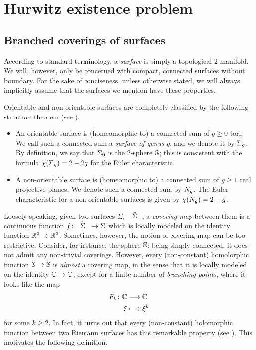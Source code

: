 \chapter{Hurwitz existence problem}

\section{Branched coverings of surfaces}

According to standard terminology, a \emph{surface} is simply a topological $2$-manifold. We will, however, only be concerned with compact, connected surfaces without boundary. For the sake of conciseness, unless otherwise stated, we will always implicitly assume that the surfaces we mention have these properties.

Orientable and non-orientable surfaces are completely classified by the following structure theorem (see ).
\begin{itemize}
\item An orientable surface is (homeomorphic to) a connected sum of $g\ge 0$ tori. We call such a connected sum a \emph{surface of genus $g$}, and we denote it by $\Sigma_{g}$. By definition, we say that $\Sigma_{0}$ is the $2$-sphere $\mathbb{S}{}$; this is consistent with the formula $\chi(\Sigma_{g})=2-2g$ for the Euler characteristic.
\item A non-orientable surface is (homeomorphic to) a connected sum of $g\ge 1$ real projective planes. We denote such a connected sum by $N_{g}$. The Euler characteristic for a non-orientable surfaces is given by $\chi(N_{g})=2-g$.
\end{itemize}

Loosely speaking, given two surfaces $\Sigma$, $\tSigma$, a \emph{covering map} between them is a continuous function $\map{f}{\tSigma}{\Sigma}$ which is locally modeled on the identity function $\umap{\RR^2}{\RR^2}$. Sometimes, however, the notion of covering map can be too restrictive. Consider, for instance, the sphere $\mathbb{S}{}$: being simply connected, it does not admit any non-trivial coverings. However, every (non-constant) homolorphic function $\umap{\sphere{}}{\sphere{}}$ is \emph{almost} a covering map, in the sense that it is locally modeled on the identity $\umap{\CC}{\CC}$, except for a finite number of \emph{branching points}, where it looks like the map
\[
\begin{alignedat}{2} F_k\colon&&\mathbb{C}&\longrightarrow\mathbb{C}\\ &&\xi&\longmapsto\xi^k \end{alignedat}
\]
for some $k\ge 2$. In fact, it turns out that every (non-constant) holomorphic function between two Riemann surfaces has this remarkable property (see ). This motivates the following definition.

